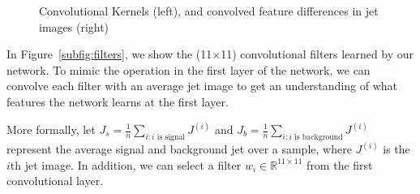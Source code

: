 \begin{figure}[bt]
  \begin{center}
      \caption{Convolutional Kernels (left), and convolved feature differences in jet images (right)}
      \label{fig:convkernels}

    \end{center}
\end{figure}

In Figure~\ref{subfig:filters}, we show the (11$\times$11) convolutional filters learned by our network. To mimic the operation in the first layer of the network, we can convolve each filter with an average jet image to get an understanding of what features the network learns at the first layer. 

More formally, let $J_s=\frac{1}{n}\sum_{i:i\text{ is signal}} J^{(i)}$ and $J_b=\frac{1}{n}\sum_{i:i\text{ is background}}J^{(i)}$ represent the average signal and background jet over a sample, where $J^{(i)}$ is the $i$th jet image. In addition, we can select a filter $w_i\in\mathbb{R}^{11\times11}$ from the first convolutional layer.

